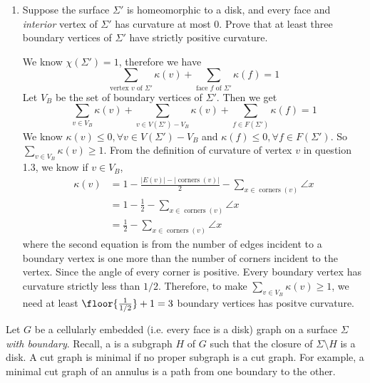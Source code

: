 \documentclass[11pt]{article}
\DeclareMathOperator{\corners}{corners}
\begin{document}
\begin{enumerate}
\begin{solution}
\end{solution}
\item
    Suppose the surface \(\Sigma'\) is homeomorphic to a disk, and every face and \emph{interior}
    vertex of \(\Sigma'\) has curvature at most \(0\).
    Prove that at least three boundary vertices of \(\Sigma'\) have strictly positive curvature.
    \begin{solution}
      We know \(\chi(\Sigma')=1\), therefore we have
      \[\sum_{\text{vertex \(v\) of \(\Sigma'\)}} \kappa(v) + \sum_{\text{face \(f\) of \(\Sigma'\)}} \kappa(f)=1\]
      Let \(V_B\) be the set of boundary vertices of \(\Sigma'\).
      Then we get
      \[\sum_{v\in V_B} \kappa(v) + \sum_{v\in V(\Sigma')-V_B}\kappa(v)+\sum_{f\in F(\Sigma')} \kappa(f)=1\]
      We know \(\kappa(v)\le 0, \forall v\in V(\Sigma')-V_B\) and \(\kappa(f)\le 0, \forall f\in F(\Sigma')\). So \(\sum_{v\in V_B} \kappa(v)\ge 1\). From the definition of curvature of vertex \(v\) in question 1.3, we know if \(v\in V_B\),
      \begin{align*}
        \kappa(v)&=1-\frac{|E(v)|-|\corners(v)|}{2}-\sum_{x \in \corners(v)} \angle x\\
            &=1-\frac{1}{2}-\sum_{x \in \corners(v)} \angle x\\
            &=\frac{1}{2}-\sum_{x \in \corners(v)} \angle x
      \end{align*}
      where the second equation is from the number of edges incident to a boundary vertex is one more than the number of corners incident to the vertex.
      Since the angle of every corner is positive. Every boundary vertex has curvature strictly less than \(1/2\). Therefore, to make \(\sum_{v\in V_B} \kappa(v)\ge 1\), we need at least \(\floor{\frac{1}{1/2}}+1=3\) boundary vertices has positve curvature.
    \end{solution}
\end{enumerate}
  Let \(G\) be a cellularly embedded (i.e. every face is a disk) graph on a surface \(\Sigma\)
  \emph{with boundary}.
  Recall, a  is a subgraph \(H\) of \(G\) such that the closure of \(\Sigma
  \setminus H\) is a disk.
  A cut graph is minimal if no proper subgraph is a cut graph.
  For example, a minimal cut graph of an annulus is a path from one boundary to the other.
\end{document}
